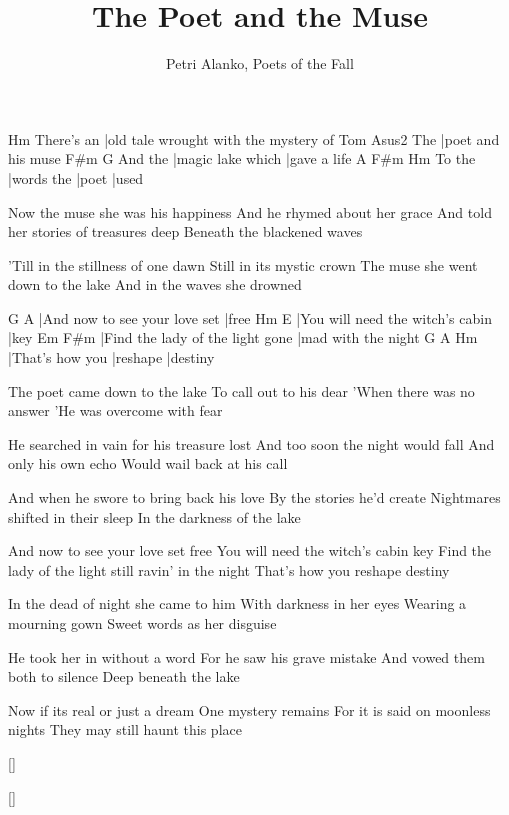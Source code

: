 \documentclass{song}
\title{The Poet and the Muse}
\author{Petri Alanko, Poets of the Fall}
\begin{document}
\begin{multicols}{2}

\strophe
           Hm
There's an |old tale wrought with the mystery of Tom
    Asus2
The |poet and his muse
        F#m               G
And the |magic lake which |gave a life
       A          F#m   Hm
To the |words the |poet |used
\endstrophe

\strophe*
Now the muse she was his happiness
And he rhymed about her grace
And told her stories of treasures deep
Beneath the blackened waves
\endstrophe

\strophe*
'Till in the stillness of one dawn
Still in its mystic crown
The muse she went down to the lake
And in the waves she drowned
\endstrophe

G                             A
|And now to see your love set |free
Hm                               E
|You will need the witch's cabin |key
Em                               F#m
|Find the lady of the light gone |mad with the night
G               A        Hm
|That's how you |reshape |destiny
\endstrophe

\strophe*
The poet came down to the lake
To call out to his dear
'When there was no answer
'He was overcome with fear
\endstrophe

\strophe*
He searched in vain for his treasure lost
And too soon the night would fall
And only his own echo
Would wail back at his call
\endstrophe

\strophe*
And when he swore to bring back his love
By the stories he'd create
Nightmares shifted in their sleep
In the darkness of the lake
\endstrophe

\varrefrain*
And now to see your love set free
You will need the witch's cabin key
Find the lady of the light still ravin' in the night
That's how you reshape destiny
\endstrophe

\columnbreak

\strophe*
In the dead of night she came to him
With darkness in her eyes
Wearing a mourning gown
Sweet words as her disguise
\endstrophe

\strophe*
He took her in without a word
For he saw his grave mistake
And vowed them both to silence
Deep beneath the lake
\endstrophe

\strophe*
Now if its real or just a dream
One mystery remains
For it is said on moonless nights
They may still haunt this place
\endstrophe

\ref{}

\ref*{}

\end{multicols}
\end{document}
